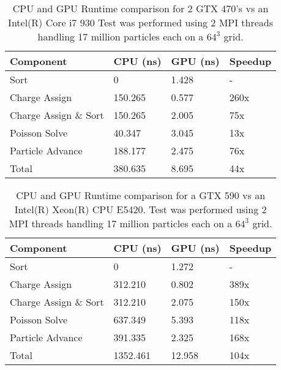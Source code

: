 \noindent \begin{table}[h]
\begin{tabular}{| p{4.0cm} | p{3.5cm} | p{2.5cm} | p{4.0cm} |}
\hline
Component & CPU (ns) & GPU (ns) & Speedup \\ \hline
Sort & 0 & 1.428 & - \\ \hline
Charge Assign & 150.265 & 0.577 & 260x \\ \hline
Charge Assign \& Sort & 150.265 & 2.005 & 75x \\ \hline
Poisson Solve & 40.347 & 3.045 & 13x \\ \hline
Particle Advance & 188.177 & 2.475 & 76x \\ \hline
Total\footnote[1] & 380.635 & 8.695 & 44x \\ \hline
\end{tabular}
\caption{CPU and GPU Runtime comparison for 2 GTX 470's vs an Intel(R) Core i7 930 Test was performed using 2 MPI threads handling 17 million particles each on a $64^3$ grid.}
\label{tab:speedup} 
\end{table}

\noindent \begin{table}[h]
\begin{tabular}{| p{4.0cm} | p{3.5cm} | p{2.5cm} | p{4.0cm} |}
\hline
Component & CPU (ns) & GPU (ns) & Speedup \\ \hline
Sort & 0 & 1.272 & - \\ \hline
Charge Assign & 312.210 & 0.802 & 389x \\ \hline
Charge Assign \& Sort & 312.210 & 2.075 & 150x \\ \hline
Poisson Solve & 637.349 & 5.393 & 118x \\ \hline
Particle Advance & 391.335 & 2.325 & 168x \\ \hline
Total\footnote[1] & 1352.461 & 12.958 & 104x \\ \hline
\end{tabular}
\caption{CPU and GPU Runtime comparison for a GTX 590 vs an Intel(R) Xeon(R) CPU E5420. Test was performed using 2 MPI threads handling 17 million particles each on a $64^3$ grid.}
\label{tab:speedup2} 
\end{table} 




\clearpage
\newpage
